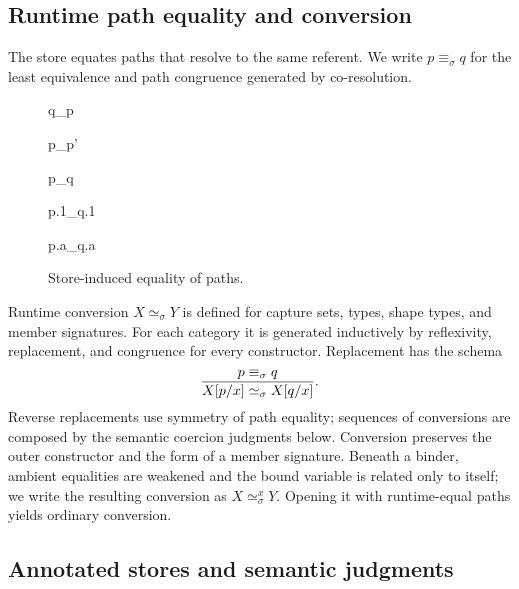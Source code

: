 \documentclass[acmsmall,screen,nonacm]{acmart}
\begin{document}
\subsection{Runtime path equality and conversion}

The store equates paths that resolve to the same referent.  We write
\(p\equiv_\sigma q\) for the least equivalence and path congruence generated
by co-resolution.

\begin{figure}[H]
\begingroup
{}
{}
\noindent
\begin{minipage}[t]{0.47\linewidth}

  {q\equiv_\sigma p}

  {p\equiv_\sigma p'}
\end{minipage}\hfill
\begin{minipage}[t]{0.51\linewidth}
  {p\equiv_\sigma q}

  {p.1\equiv_\sigma q.1}

  {p.a\equiv_\sigma q.a}
\end{minipage}
\endgroup
\caption{Store-induced equality of paths.}
\label{fig:runtime-equality}
\end{figure}

Runtime conversion \(X\simeq_\sigma Y\) is defined for capture sets,
types, shape types, and member signatures. For each category it is generated
inductively by reflexivity, replacement, and congruence for every constructor.
Replacement has the schema
\[
  \frac{p\equiv_\sigma q}
       {X[p/x]\simeq_\sigma X[q/x]}.
\]
Reverse replacements use symmetry of path equality; sequences of conversions
are composed by the semantic coercion judgments below. Conversion preserves
the outer constructor and the form of a member signature. Beneath a binder,
ambient equalities are weakened and the bound variable is related only to
itself; we write the resulting conversion as
\(X\simeq^x_\sigma Y\).  Opening it with runtime-equal paths yields ordinary
conversion.

\subsection{Annotated stores and semantic judgments}
\end{document}
